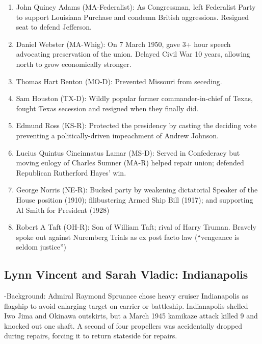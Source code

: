 \documentclass[
]{article}
\begin{document}
\begin{enumerate}
\def\labelenumi{\arabic{enumi}.}
\item
  John Quincy Adams (MA-Federalist): As Congressman, left Federalist
  Party to support Louisiana Purchase and condemn British aggressions.
  Resigned seat to defend Jefferson.
\item
  Daniel Webster (MA-Whig): On 7 March 1950, gave 3+ hour speech
  advocating preservation of the union. Delayed Civil War 10 years,
  allowing north to grow economically stronger.
\item
  Thomas Hart Benton (MO-D): Prevented Missouri from seceding.
\item
  Sam Houston (TX-D): Wildly popular former commander-in-chief of Texas,
  fought Texas secession and resigned when they finally did.
\item
  Edmund Ross (KS-R): Protected the presidency by casting the deciding
  vote preventing a politically-driven impeachment of Andrew Johnson.
\item
  Lucius Quintus Cincinnatus Lamar (MS-D): Served in Confederacy but
  moving eulogy of Charles Sumner (MA-R) helped repair union; defended
  Republican Rutherford Hayes' win.
\item
  George Norris (NE-R): Bucked party by weakening dictatorial Speaker of
  the House position (1910); filibustering Armed Ship Bill (1917); and
  supporting Al Smith for President (1928)
\item
  Robert A Taft (OH-R): Son of William Taft; rival of Harry Truman.
  Bravely spoke out against Nuremberg Trials as ex post facto law
  (``vengeance is seldom justice'')
\end{enumerate}

\hypertarget{lynn-vincent-and-sarah-vladic-indianapolis}{%
\subsection{Lynn Vincent and Sarah Vladic:
Indianapolis}\label{lynn-vincent-and-sarah-vladic-indianapolis}}

-Background: Admiral Raymond Spruance chose heavy cruiser Indianapolis
as flagship to avoid enlarging target on carrier or battleship.
Indianapolis shelled Iwo Jima and Okinawa outskirts, but a March 1945
kamikaze attack killed 9 and knocked out one shaft. A second of four
propellers was accidentally dropped during repairs, forcing it to return
stateside for repairs.
\end{document}
